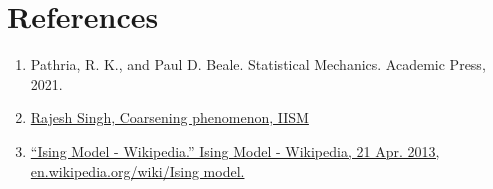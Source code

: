 \documentclass[5p,authoryear]{elsarticle}
\begin{document}
\section{References}
\begin{enumerate}
  \item Pathria, R. K., and Paul D. Beale. Statistical Mechanics. Academic Press, 2021.
  \item \href{https://files.speakerdeck.com/presentations/1d7f8f8af5714772b1ea4d007009655d/kpt.pdf}{Rajesh Singh, Coarsening phenomenon, IISM}
  \item \href{https://en.wikipedia.org/wiki/Ising_model}{“Ising Model - Wikipedia.” Ising Model - Wikipedia, 21 Apr. 2013, en.wikipedia.org/wiki/Ising model.}
\end{enumerate}
\end{document}
